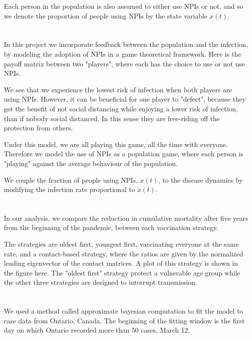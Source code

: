 \documentclass{article}
\begin{document}
Each person in the population is also assumed to either use NPIs or not, and so we denote the proportion of people using NPIs by the state variable $x(t)$.



\section{}
In this project we incorporate feedback between the population and the infection, by modeling the adoption of NPIs in a game theoretical framework. Here is the payoff matrix between two "players", where each has the choice to use or not use NPIs. 

We see that we experience the lowest risk of infection when both players are using NPIs. However, it can be beneficial for one player to "defect", because they get the benefit of not social distancing while enjoying a lower risk of infection, than if nobody social distanced. In this sense they are free-riding off the protection from others.

Under this model, we are all playing this game, all the time with everyone. Therefore we model the use of NPIs as a population game, where each person is "playing" against the average behaviour of the population.

We couple the fraction of people using NPIs, $x(t)$,  to the disease dynamics by modifying the infection rate proportional to $x(t)$.

\section{}

In our analysis, we compare the reduction in  cumulative mortality after five years from the beginning of the pandemic, between each vaccination strategy.

The strategies are oldest first, youngest first, vaccinating everyone at the same rate, and a contact-based strategy, where the ratios are given by the normalized leading eigenvector of the contact matrices. A plot of this strategy is shown in the figure here. The "oldest first" strategy protect a vulnerable age group while the other three strategies are designed to interrupt transmission.


\section{}
We used a method called approximate bayesian computation to fit the model to case data from Ontario, Canada. The beginning of the fitting window is the first day on which Ontario recorded more than 50 cases, March 12.
\end{document}
